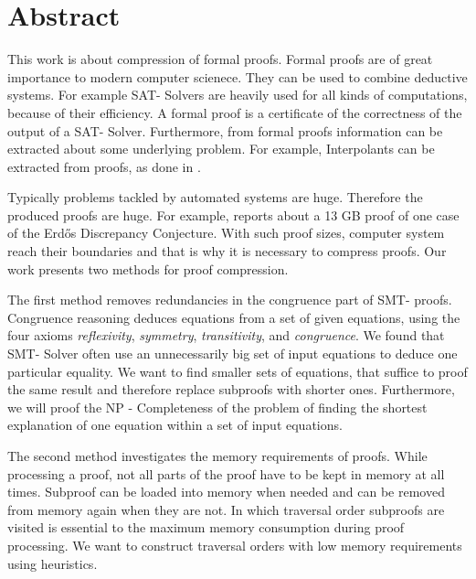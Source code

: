 \chapter*{Abstract}

This work is about compression of formal proofs.
Formal proofs are of great importance to modern computer scienece.
They can be used to combine deductive systems.
For example SAT- Solvers \cite{Biere2009} are heavily used for all kinds of computations, because of their efficiency.
A formal proof is a certificate of the correctness of the output of a SAT- Solver.
Furthermore, from formal proofs information can be extracted about some underlying problem.
For example, Interpolants \cite{McMill2005} can be extracted from proofs, as done in \cite{Hofferek2013}.

Typically problems tackled by automated systems are huge. 
Therefore the produced proofs are huge.
For example, \cite{Konev2014} reports about a 13 GB proof of one case of the Erd\H{o}s Discrepancy Conjecture.
With such proof sizes, computer system reach their boundaries and that is why it is necessary to compress proofs.
Our work presents two methods for proof compression.

The first method removes redundancies in the congruence part of SMT- proofs.
Congruence reasoning deduces equations from a set of given equations, using the four axioms \emph{reflexivity}, \emph{symmetry}, \emph{transitivity}, and \emph{congruence}.
We found that SMT- Solver often use an unnecessarily big set of input equations to deduce one particular equality.
We want to find smaller sets of equations, that suffice to proof the same result and therefore replace subproofs with shorter ones.
Furthermore, we will proof the NP - Completeness of the problem of finding the shortest explanation of one equation within a set of input equations.

The second method investigates the memory requirements of proofs.
While processing a proof, not all parts of the proof have to be kept in memory at all times.
Subproof can be loaded into memory when needed and can be removed from memory again when they are not.
In which traversal order subproofs are visited is essential to the maximum memory consumption during proof processing.
We want to construct traversal orders with low memory requirements using heuristics. 